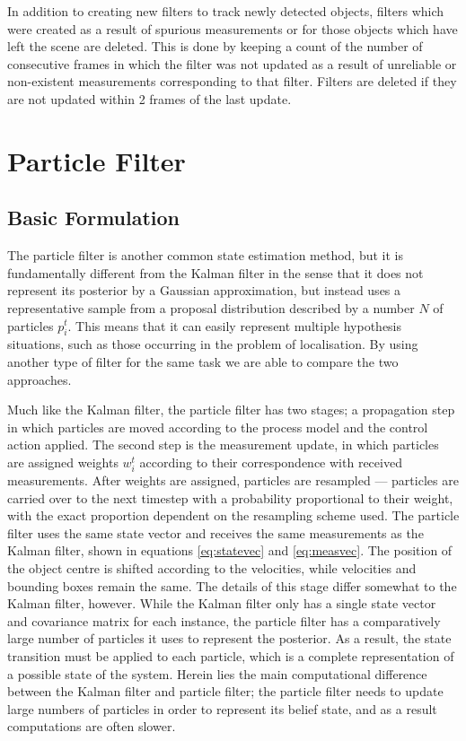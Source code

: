 \documentclass[conference]{IEEEtran}
\begin{document}
In addition to creating new filters to track newly detected objects, filters
which were created as a result of spurious measurements or for those objects
which have left the scene are deleted. This is done by keeping a count of the
number of consecutive frames in which the filter was not updated as a result of
unreliable or non-existent measurements corresponding to that filter. Filters
are deleted if they are not updated within 2 frames of the last update.
\section{Particle Filter}
\subsection{Basic Formulation}
The particle filter is another common state estimation method, but it is
fundamentally different from the Kalman filter in the sense that it does not
represent its posterior by a Gaussian approximation, but instead uses a
representative sample from a proposal distribution described by a number $N$ of
particles $p_i^t$. This means that it can easily represent multiple hypothesis
situations, such as those occurring in the problem of localisation. By using
another type of filter for the same task we are able to compare the two
approaches.

Much like the Kalman filter, the particle filter has two stages; a propagation
step in which particles are moved according to the process model and the control
action applied. The second step is the measurement update, in which particles
are assigned weights $w_i^t$ according to their correspondence with received
measurements. After weights are assigned, particles are resampled --- particles
are carried over to the next timestep with a probability proportional to their
weight, with the exact proportion dependent on the resampling scheme used. The
particle filter uses the same state vector and receives the same measurements as
the Kalman filter, shown in equations \eqref{eq:statevec} and
\eqref{eq:measvec}. The position of the object centre is shifted according to
the velocities, while velocities and bounding boxes remain the same. The details
of this stage differ somewhat to the Kalman filter, however. While the Kalman
filter only has a single state vector and covariance matrix for each instance,
the particle filter has a comparatively large number of particles it uses to
represent the posterior. As a result, the state transition must be applied to
each particle, which is a complete representation of a possible state of the
system. Herein lies the main computational difference between the Kalman filter
and particle filter; the particle filter needs to update large numbers of
particles in order to represent its belief state, and as a result computations
are often slower.
\end{document}
